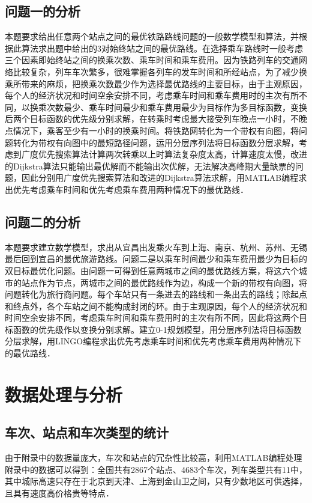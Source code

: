 \documentclass[nocover]{cumcmart}%
\begin{document}
\subsection{问题一的分析}
本题要求给出任意两个站点之间的最优铁路路线问题的一般数学模型和算法，并根据此算法求出题中给出的3对始终站之间的最优路线。在选择乘车路线时一般考虑三个因素即始终站之间的换乘次数、乘车时间和乘车费用。因为铁路列车的交通网络比较复杂，列车车次繁多，很难掌握各列车的发车时间和所经站点，为了减少换乘所带来的麻烦，把换乘次数最少作为选择最优路线的主要目标，由于主观原因，每个人的经济状况和时间空余安排不同，考虑乘车时间和乘车费用时的主次有所不同，以换乘次数最少、乘车时间最少和乘车费用最少为目标作为多目标函数，变换后两个目标函数的优先级分别求解，在转乘时考虑最大接受列车晚点一小时，不晚点情况下，乘客至少有一小时的换乘时间。将铁路网转化为一个带权有向图，将问题转化为带权有向图中的最短路径问题，运用分层序列法将目标函数分层求解，考虑到广度优先搜索算法计算两次转乘以上时算法复杂度太高，计算速度太慢，改进的Dijkstra算法只能输出最优解而不能输出次优解，无法解决高峰期大量缺票的问题，因此分别用广度优先搜索算法和改进的Dijkstra算法求解，用MATLAB编程求出优先考虑乘车时间和优先考虑乘车费用两种情况下的最优路线．
\subsection{问题二的分析}
本题要求建立数学模型，求出从宜昌出发乘火车到上海、南京、杭州、苏州、无锡最后回到宜昌的最优旅游路线。问题二是以乘车时间最少和乘车费用最少为目标的双目标最优化问题。由问题一可得到任意两城市之间的最优路线方案，将这六个城市的站点作为节点，两城市之间的最优路线作为边，构成一个新的带权有向图，将问题转化为旅行商问题。每个车站只有一条进去的路线和一条出去的路线；除起点和终点外，各个车站之间不能构成封闭的环。由于主观原因，每个人的经济状况和时间空余安排不同，考虑乘车时间和乘车费用时的主次有所不同，因此将这两个目标函数的优先级作以变换分别求解。建立0-1规划模型，用分层序列法将目标函数分层求解，用LINGO编程求出优先考虑乘车时间和优先考虑乘车费用两种情况下的最优路线．

\section{数据处理与分析}
\subsection{车次、站点和车次类型的统计}
由于附录中的数据量庞大，车次和站点的冗杂性比较高，利用MATLAB编程处理附录中的数据可以得到：全国共有2867个站点、4683个车次，列车类型共有11中，其中城际高速只存在于北京到天津、上海到金山卫之间，只有少数地区可供选择，且具有速度高价格贵等特点．
\end{document}
